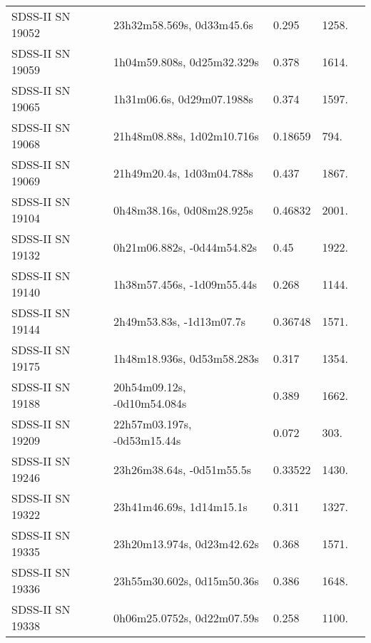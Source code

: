 \begin{longtable}{lllll}
 SDSS-II SN 19052 &      23h32m58.569s, 0d33m45.6s &    0.295 &          1258. &    \citet{2011ApJ...738..162S} \\
 SDSS-II SN 19059 &     1h04m59.808s, 0d25m32.329s &    0.378 &          1614. &    \citet{2011ApJ...738..162S} \\
 SDSS-II SN 19065 &      1h31m06.6s, 0d29m07.1988s &    0.374 &          1597. &    \citet{2011ApJ...738..162S} \\
 SDSS-II SN 19068 &     21h48m08.88s, 1d02m10.716s &  0.18659 &           794. &    \citet{2016SDSSD.C...0000:} \\
 SDSS-II SN 19069 &      21h49m20.4s, 1d03m04.788s &    0.437 &          1867. &    \citet{2011ApJ...738..162S} \\
 SDSS-II SN 19104 &      0h48m38.16s, 0d08m28.925s &  0.46832 &          2001. &    \citet{2016SDSSD.C...0000:} \\
 SDSS-II SN 19132 &     0h21m06.882s, -0d44m54.82s &     0.45 &          1922. &    \citet{2011ApJ...738..162S} \\
 SDSS-II SN 19140 &     1h38m57.456s, -1d09m55.44s &    0.268 &          1144. &    \citet{2011ApJ...738..162S} \\
 SDSS-II SN 19144 &       2h49m53.83s, -1d13m07.7s &  0.36748 &          1571. &    \citet{2016SDSSD.C...0000:} \\
 SDSS-II SN 19175 &     1h48m18.936s, 0d53m58.283s &    0.317 &          1354. &    \citet{2011ApJ...738..162S} \\
 SDSS-II SN 19188 &    20h54m09.12s, -0d10m54.084s &    0.389 &          1662. &    \citet{2011ApJ...738..162S} \\
 SDSS-II SN 19209 &    22h57m03.197s, -0d53m15.44s &    0.072 &           303. &    \citet{2011ApJ...738..162S} \\
 SDSS-II SN 19246 &      23h26m38.64s, -0d51m55.5s &  0.33522 &          1430. &    \citet{2016SDSSD.C...0000:} \\
 SDSS-II SN 19322 &       23h41m46.69s, 1d14m15.1s &    0.311 &          1327. &    \citet{2010ApJ...713.1026D} \\
 SDSS-II SN 19335 &     23h20m13.974s, 0d23m42.62s &    0.368 &          1571. &    \citet{2011ApJ...738..162S} \\
 SDSS-II SN 19336 &     23h55m30.602s, 0d15m50.36s &    0.386 &          1648. &    \citet{2010ApJ...713.1026D} \\
 SDSS-II SN 19338 &     0h06m25.0752s, 0d22m07.59s &    0.258 &          1100. &    \citet{2011ApJ...738..162S} \\

\end{longtable}
